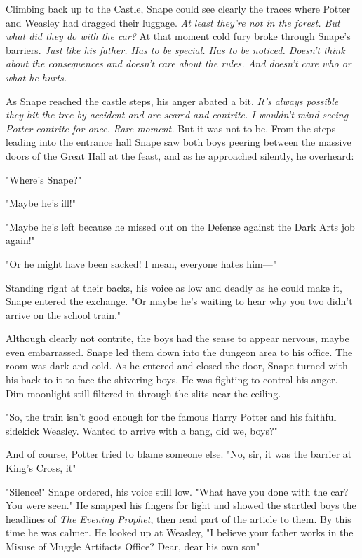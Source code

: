 Climbing back up to the Castle, Snape could see clearly the traces where Potter and Weasley had dragged their luggage. \emph{At least they're not in the forest. But what did they do with the car?} At that moment cold fury broke through Snape's barriers. \emph{Just like his father. Has to be special. Has to be noticed. Doesn't think about the consequences and doesn't care about the rules. And doesn't care who or what he hurts.}

As Snape reached the castle steps, his anger abated a bit. \emph{It's always possible they hit the tree by accident and are scared and contrite. I wouldn't mind seeing Potter contrite for once. Rare moment.} But it was not to be. From the steps leading into the entrance hall Snape saw both boys peering between the massive doors of the Great Hall at the feast, and as he approached silently, he overheard:

"Where's Snape?"

"Maybe he's ill!"

"Maybe he's left because he missed out on the Defense against the Dark Arts job again!"

"Or he might have been sacked! I mean, everyone hates him—"

Standing right at their backs, his voice as low and deadly as he could make it, Snape entered the exchange. "Or maybe he's waiting to hear why you two didn't arrive on the school train."

Although clearly not contrite, the boys had the sense to appear nervous, maybe even embarrassed. Snape led them down into the dungeon area to his office. The room was dark and cold. As he entered and closed the door, Snape turned with his back to it to face the shivering boys. He was fighting to control his anger. Dim moonlight still filtered in through the slits near the ceiling.

"So, the train isn't good enough for the famous Harry Potter and his faithful sidekick Weasley. Wanted to arrive with a bang, did we, boys?"

And of course, Potter tried to blame someone else. "No, sir, it was the barrier at King's Cross, it{\el}"

"Silence!" Snape ordered, his voice still low. "What have you done with the car? You were seen." He snapped his fingers for light and showed the startled boys the headlines of \emph{The Evening Prophet}, then read part of the article to them. By this time he was calmer. He looked up at Weasley, "I believe your father works in the Misuse of Muggle Artifacts Office? Dear, dear{\el} his own son{\el}"

